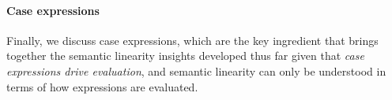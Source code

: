 \documentclass[acmsmall,review,anonymous,screen]{acmart}
\newcommand{\parawith}[1]{\paragraph{\emph{#1}}}
\begin{document}

\paragraph{Case expressions}
Finally, we discuss case expressions,
which are the key ingredient that brings together the
semantic linearity insights developed thus far given that
\emph{case expressions drive evaluation}, and semantic linearity can only be
understood in terms of how expressions are evaluated.
\end{document}

